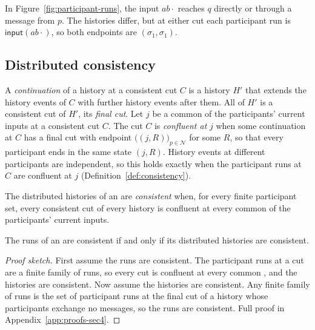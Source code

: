 In Figure~\ref{fig:participant-runs}, the input $ab\cdot$ reaches $q$
directly or through a message from $p$.  The histories differ, but at either
cut each participant run is $\mathsf{input}(ab\cdot)$, so both endpoints are
$(\sigma_1,\sigma_1)$.

\subsection{Distributed consistency}
\label{sec:distributed-consistency}

A \emph{continuation} of a history at a consistent cut $C$ is a history $H'$
that extends the history events of $C$ with further history events after
them.  All of $H'$ is a consistent cut of $H'$, its \emph{final cut}.  Let $j$ be a common \indesc of the participants' current inputs at a consistent cut $C$.  The cut $C$ is \emph{confluent at} $j$ when some continuation at $C$ has a final cut with endpoint $\bigl((j,R)\bigr)_{p\in\mathcal N}$ for some $R$, so that every participant ends in the same state $(j,R)$.  History events at different participants are independent, so this holds exactly when the participant runs at $C$ are
confluent at $j$ (Definition~\ref{def:consistency}).

\begin{definition}
\label{def:distributed-consistency}
The distributed histories of an \spectype are \emph{consistent} when, for every
finite participant set, every consistent cut of every history is confluent
at every common \indesc of the participants' current inputs.
\end{definition}

\begin{proposition}
\label{prop:distributed-consistency}
The runs of an \spectype are consistent if and only if its distributed
histories are consistent.
\end{proposition}

\begin{proof}[Proof sketch]
First assume the runs are consistent.  The participant runs at a cut are a
finite family of runs, so every cut is confluent at every common \indesc, and the histories are
consistent.  Now assume the histories are consistent.  Any finite family of
runs is the set of participant runs at the final cut of a history whose
participants exchange no messages, so the runs are consistent.  Full proof in
Appendix~\ref{app:proofs-sec4}.
\end{proof}

